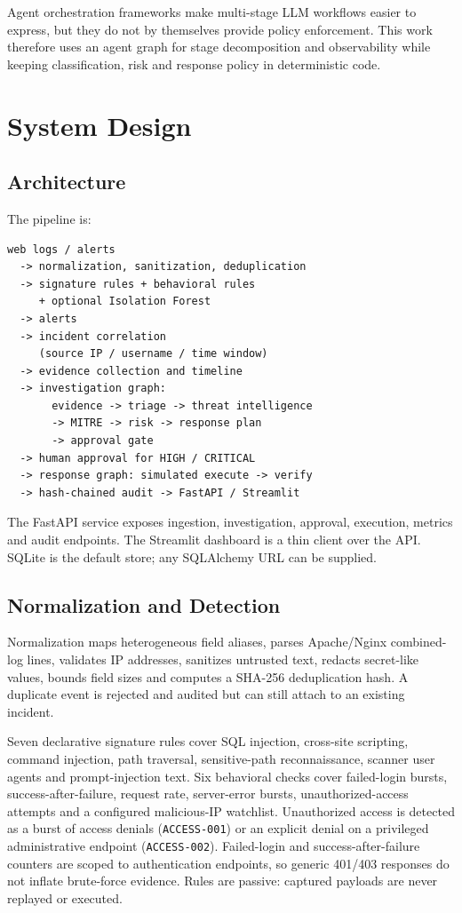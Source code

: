 \documentclass[10pt,twocolumn]{article}
\begin{document}
Agent orchestration frameworks make multi-stage LLM workflows easier to express, but they do not by themselves provide policy enforcement. This work therefore uses an agent graph for stage decomposition and observability while keeping classification, risk and response policy in deterministic code.

\section{System Design}

\subsection{Architecture}

The pipeline is:
\begin{small}
\begin{verbatim}
web logs / alerts
  -> normalization, sanitization, deduplication
  -> signature rules + behavioral rules
     + optional Isolation Forest
  -> alerts
  -> incident correlation
     (source IP / username / time window)
  -> evidence collection and timeline
  -> investigation graph:
       evidence -> triage -> threat intelligence
       -> MITRE -> risk -> response plan
       -> approval gate
  -> human approval for HIGH / CRITICAL
  -> response graph: simulated execute -> verify
  -> hash-chained audit -> FastAPI / Streamlit
\end{verbatim}
\end{small}

The FastAPI service exposes ingestion, investigation, approval, execution, metrics and audit endpoints. The Streamlit dashboard is a thin client over the API. SQLite is the default store; any SQLAlchemy URL can be supplied.

\subsection{Normalization and Detection}

Normalization maps heterogeneous field aliases, parses Apache/Nginx combined-log lines, validates IP addresses, sanitizes untrusted text, redacts secret-like values, bounds field sizes and computes a SHA-256 deduplication hash. A duplicate event is rejected and audited but can still attach to an existing incident.

Seven declarative signature rules cover SQL injection, cross-site scripting, command injection, path traversal, sensitive-path reconnaissance, scanner user agents and prompt-injection text. Six behavioral checks cover failed-login bursts, success-after-failure, request rate, server-error bursts, unauthorized-access attempts and a configured malicious-IP watchlist. Unauthorized access is detected as a burst of access denials (\texttt{ACCESS-001}) or an explicit denial on a privileged administrative endpoint (\texttt{ACCESS-002}). Failed-login and success-after-failure counters are scoped to authentication endpoints, so generic 401/403 responses do not inflate brute-force evidence. Rules are passive: captured payloads are never replayed or executed.
\end{document}
